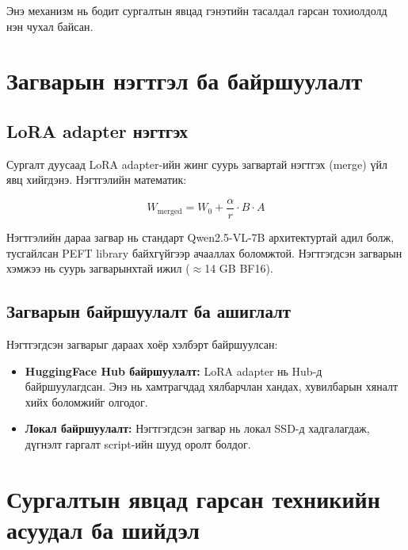 Энэ механизм нь бодит сургалтын явцад гэнэтийн тасалдал гарсан тохиолдолд нэн чухал байсан.

\section{Загварын нэгтгэл ба байршуулалт}

\subsection{LoRA adapter нэгтгэх}

Сургалт дуусаад LoRA adapter-ийн жинг суурь загвартай нэгтгэх (merge) үйл явц хийгдэнэ. Нэгтгэлийн математик:

\begin{equation}
    W_{\text{merged}} = W_0 + \frac{\alpha}{r} \cdot B \cdot A
\end{equation}

Нэгтгэлийн дараа загвар нь стандарт Qwen2.5-VL-7B архитектуртай адил болж, тусгайлсан PEFT library байхгүйгээр ачааллах боломжтой. Нэгтгэгдсэн загварын хэмжээ нь суурь загварынхтай ижил ($\approx$14 GB BF16).

\subsection{Загварын байршуулалт ба ашиглалт}

Нэгтгэгдсэн загварыг дараах хоёр хэлбэрт байршуулсан:

\begin{itemize}
    \item \textbf{HuggingFace Hub байршуулалт:} LoRA adapter нь Hub-д байршуулагдсан.
    Энэ нь хамтрагчдад хялбарчлан хандах, хувилбарын хяналт хийх боломжийг олгодог.

    \item \textbf{Локал байршуулалт:} Нэгтгэгдсэн загвар нь локал SSD-д хадгалагдаж,\\ дүгнэлт гаргалт script-ийн шууд оролт болдог.
\end{itemize}

\section{Сургалтын явцад гарсан техникийн асуудал ба шийдэл}

